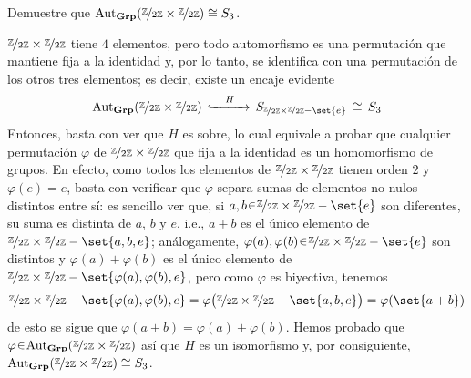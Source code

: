 \begin{ejer}
    Demuestre que $\aut_{\cat{Grp}}(%
        \nicefrac{\mathbb{Z}}{2\mathbb{Z}} \times \nicefrac{\mathbb{Z}}{2\mathbb{Z}}%
    )%
    \cong S_3$.
\end{ejer}
\begin{sol}
    $\nicefrac{\mathbb{Z}}{2\mathbb{Z}} \times \nicefrac{\mathbb{Z}}{2\mathbb{Z}}$ tiene $4$ elementos, pero todo automorfismo es una permutación que mantiene fija a la identidad y, por lo tanto, se identifica con una permutación de los otros tres elementos; es decir, existe un encaje evidente
    \[
        \aut_{\cat{Grp}}(%
            \nicefrac{\mathbb{Z}}{2\mathbb{Z}} \times \nicefrac{\mathbb{Z}}{2\mathbb{Z}}%
        )%
        \,\xhookrightarrow{\quad{H}\quad}\, S_{%
            \nicefrac{\mathbb{Z}}{2\mathbb{Z}} \times \nicefrac{\mathbb{Z}}{2\mathbb{Z}}-\set{e}%
        }%
        \,\cong\, S_3 
    \]
    Entonces, basta con ver que $H$ es sobre, lo cual equivale a probar que cualquier permutación $\varphi$ de $\nicefrac{\mathbb{Z}}{2\mathbb{Z}} \times \nicefrac{\mathbb{Z}}{2\mathbb{Z}}$
    que fija a la identidad es un homomorfismo de grupos. En efecto, como todos los elementos de $\nicefrac{\mathbb{Z}}{2\mathbb{Z}} \times \nicefrac{\mathbb{Z}}{2\mathbb{Z}}$ tienen orden $2$ y $\varphi(e) = e$, basta con verificar que $\varphi$ separa sumas de elementos no nulos distintos entre sí: es sencillo ver que, si $a,b \en \nicefrac{\mathbb{Z}}{2\mathbb{Z}} \times \nicefrac{\mathbb{Z}}{2\mathbb{Z}} - \set{e}$ son diferentes, su suma es distinta de $a$, $b$ y $e$, i.e., $a + b$ es el único elemento de $\nicefrac{\mathbb{Z}}{2\mathbb{Z}} \times \nicefrac{\mathbb{Z}}{2\mathbb{Z}} - \set{a, b, e}$; análogamente, $\varphi(a), \varphi(b) \en \nicefrac{\mathbb{Z}}{2\mathbb{Z}} \times \nicefrac{\mathbb{Z}}{2\mathbb{Z}} - \set{e}$ son distintos y $\varphi(a) + \varphi(b)$ es el único elemento de $\nicefrac{\mathbb{Z}}{2\mathbb{Z}} \times \nicefrac{\mathbb{Z}}{2\mathbb{Z}} - \set{\varphi(a), \varphi(b), e}$, pero como $\varphi$ es biyectiva, tenemos
    \[          
        \nicefrac{\mathbb{Z}}{2\mathbb{Z}} \times \nicefrac{\mathbb{Z}}{2\mathbb{Z}} - \set{\varphi(a), \varphi(b), e}%
        = \varphi\big(%
            \nicefrac{\mathbb{Z}}{2\mathbb{Z}} \times \nicefrac{\mathbb{Z}}{2\mathbb{Z}} - \set{a, b, e}
        \big)%
        = \varphi(\set{a+b})
    \]
    de esto se sigue que $\varphi(a + b) = \varphi(a) + \varphi(b)$. Hemos probado que $\varphi \en \aut_{\cat{Grp}}(\nicefrac{\mathbb{Z}}{2\mathbb{Z}} \times \nicefrac{\mathbb{Z}}{2\mathbb{Z}})$ así que $H$ es un isomorfismo y, por consiguiente, $\operatorname{Aut}_{\mathbf{Grp}}(\nicefrac{\mathbb{Z}}{2\mathbb{Z}} \times \nicefrac{\mathbb{Z}}{2\mathbb{Z}}) \cong S_3$.
\end{sol}



